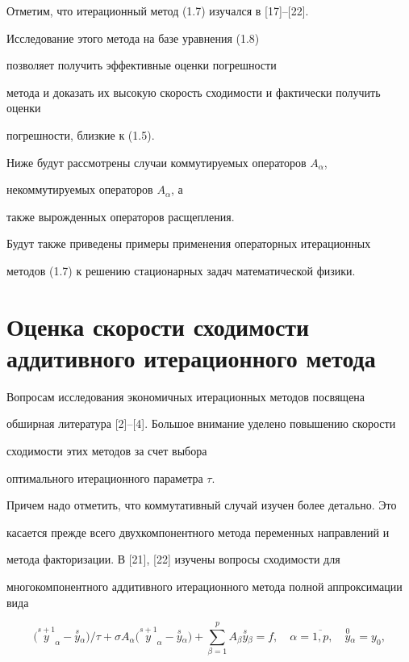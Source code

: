 Отметим, что итерационный метод (1.7) изучался в [17]--[22].


Исследование этого метода на базе уравнения (1.8) 


позволяет получить эффективные оценки погрешности


метода и доказать их высокую скорость сходимости и фактически получить оценки 


погрешности, близкие к (1.5).





Ниже будут рассмотрены случаи коммутируемых операторов $A_\alpha$,


некоммутируемых операторов $A_\alpha$, а 


также вырожденных операторов расщепления.


Будут также приведены примеры применения операторных итерационных


методов (1.7) к решению стационарных задач математической физики.





\section{Оценка скорости сходимости аддитивного итерационного метода}





Вопросам исследования экономичных итерационных методов посвящена 


обширная литература [2]--[4]. Большое внимание уделено повышению скорости


сходимости этих методов за счет выбора 


оптимального итерационного параметра $\tau$.


Причем надо отметить, что коммутативный случай изучен более детально. Это


касается прежде всего двухкомпонентного метода переменных направлений и


метода факторизации. В [21], [22] изучены вопросы сходимости для 


многокомпонентного аддитивного итерационного метода полной аппроксимации вида 


\begin{equation}


\Big(\overset{s+1}{y}_{\!\!\!\alpha}


-\overset{s}{y}{}_\alpha\Big)/\tau+


\sigma A_\alpha\Big(\overset{s+1}{y}_{\!\!\!\alpha}


-\overset{s}{y}{}_\alpha\Big)+


\sum\limits_{\beta=1}^p A_\beta \overset{s}{y}{}_\beta=f,\quad


\alpha=\overline {1,p},\quad\overset{0}{y}{}_\alpha=y_0,


\end{equation}



